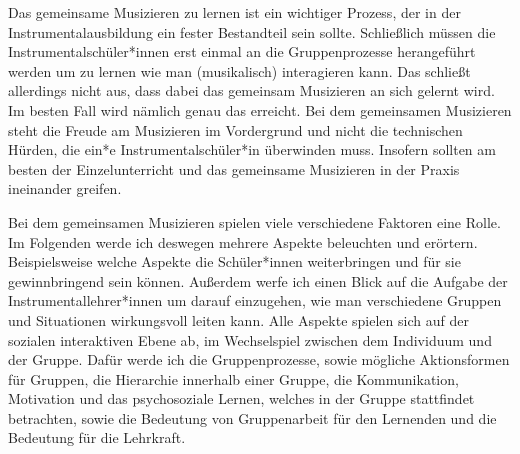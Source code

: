 
Das gemeinsame Musizieren zu lernen ist ein wichtiger Prozess, der in der
Instrumentalausbildung ein fester Bestandteil sein sollte. Schließlich müssen
die Instrumentalschüler*innen erst einmal an die Gruppenprozesse herangeführt
werden um zu lernen wie man (musikalisch) interagieren kann. Das schließt
allerdings nicht aus, dass dabei das gemeinsam Musizieren an sich gelernt wird.
Im besten Fall wird nämlich genau das erreicht. Bei dem gemeinsamen Musizieren
steht die Freude am Musizieren im Vordergrund und nicht die technischen Hürden,
die ein*e Instrumentalschüler*in überwinden muss. Insofern sollten am besten der
Einzelunterricht und das gemeinsame Musizieren in der Praxis ineinander greifen.

Bei dem gemeinsamen Musizieren spielen viele verschiedene Faktoren eine Rolle.
Im Folgenden werde ich deswegen mehrere Aspekte beleuchten und erörtern.
Beispielsweise welche Aspekte die Schüler*innen weiterbringen und für sie
gewinnbringend sein können. Außerdem werfe ich einen Blick auf die Aufgabe der
Instrumentallehrer*innen um darauf einzugehen, wie man verschiedene Gruppen und
Situationen wirkungsvoll leiten kann. Alle Aspekte spielen sich auf der sozialen
interaktiven Ebene ab, im Wechselspiel zwischen dem Individuum und der Gruppe.
Dafür werde ich die Gruppenprozesse, sowie mögliche Aktionsformen für Gruppen,
die Hierarchie innerhalb einer Gruppe, die Kommunikation, Motivation und das
psychosoziale Lernen, welches in der Gruppe stattfindet betrachten, sowie die
Bedeutung von Gruppenarbeit für den Lernenden und die Bedeutung für die
Lehrkraft.






























